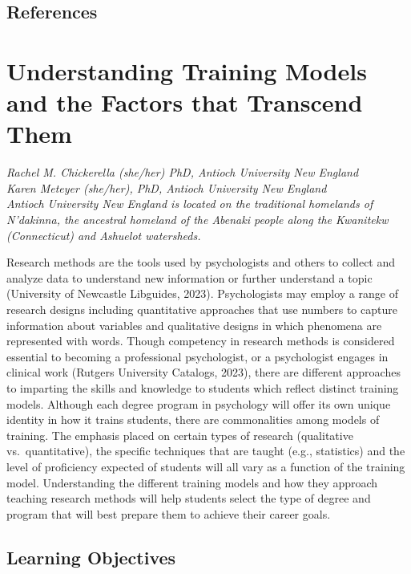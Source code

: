 \documentclass[
  11pt,
]{book}
\begin{document}
\section{References}\label{references}

\chapter{Understanding Training Models and the Factors that Transcend Them}\label{TrainMod}

\emph{Rachel M. Chickerella (she/her) PhD, Antioch University New England}\\
\emph{Karen Meteyer (she/her), PhD, Antioch University New England}\\

\emph{Antioch University New England is located on the traditional homelands of N'dakinna, the ancestral homeland of the Abenaki people along the Kwanitekw (Connecticut) and Ashuelot watersheds.}~

Research methods are the tools used by psychologists and others to collect and analyze data to understand new information or further understand a topic (University of Newcastle Libguides, 2023). Psychologists may employ a range of research designs including quantitative approaches that use numbers to capture information about variables and qualitative designs in which phenomena are represented with words. Though competency in research methods is considered essential to becoming a professional psychologist, or a psychologist engages in clinical work (Rutgers University Catalogs, 2023), there are different approaches to imparting the skills and knowledge to students which reflect distinct training models. Although each degree program in psychology will offer its own unique identity in how it trains students, there are commonalities among models of training. The emphasis placed on certain types of research (qualitative vs.~quantitative), the specific techniques that are taught (e.g., statistics) and the level of proficiency expected of students will all vary as a function of the training model. Understanding the different training models and how they approach teaching research methods will help students select the type of degree and program that will best prepare them to achieve their career goals.

\section{Learning Objectives}\label{learning-objectives-1}
\end{document}
